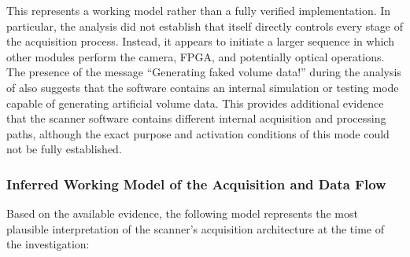 This represents a working model rather than a fully verified implementation. In particular, the analysis did not establish that  itself directly controls every stage of the acquisition process. Instead, it appears to initiate a larger sequence in which other modules perform the camera, FPGA, and potentially optical operations. The presence of the message ``Generating faked volume data!'' during the analysis of  also suggests that the software contains an internal simulation or testing mode capable of generating artificial volume data. This provides additional evidence that the scanner software contains different internal acquisition and processing paths, although the exact purpose and activation conditions of this mode could not be fully established.

\subsubsection{Inferred Working Model of the Acquisition and Data Flow}

Based on the available evidence, the following model represents the most plausible interpretation of the scanner's acquisition architecture at the time of the investigation:

